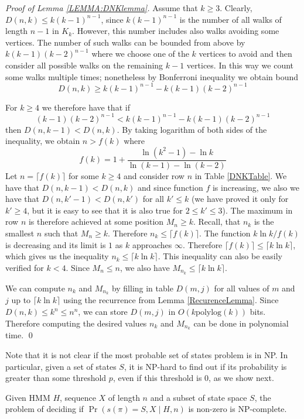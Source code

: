 \begin{proof}[Proof of Lemma \ref{LEMMA:DNKlemma}] 
Assume that $k\ge 3$. Clearly, $D(n,k)\leq k(k-1)^{n-1}$, since
$k(k-1)^{n-1}$ is the number of all walks of length $n-1$ in
$K_k$. However, this number includes also walks avoiding some
vertices. The number of such walks can be bounded from above by
$k(k-1)(k-2)^{n-1}$ where we choose one of the $k$ vertices to avoid
and then consider all possible walks on the remaining $k-1$
vertices. In this way we count some walks multiple times; nonetheless
by Bonferroni inequality we obtain bound $$D(n,k)\geq
k(k-1)^{n-1}-k(k-1)(k-2)^{n-1}$$

For $k\ge 4$ we therefore have that if
$$(k-1)(k-2)^{n-1}<k(k-1)^{n-1}-k(k-1)(k-2)^{n-1}$$ then
$D(n,k-1)<D(n,k)$.  By taking logarithm of both sides of the inequality, we
obtain $n>f(k)$ where $$f(k) = 1+\frac{\ln(k^2-1)-\ln
  k}{\ln(k-1)-\ln(k-2)}$$  Let $n = \lceil f(k)\rceil$ for some $k\ge
4$ and consider row $n$ in Table \ref{DNKTable}.
We have that $D(n,k-1)<D(n,k)$ and since function $f$ is
increasing, we also we have that $D(n,k'-1)<D(n,k')$ for all $k'\le k$ 
(we have proved it only for $k'\ge 4$, but it is easy to see that it is
also true for $2\le k'\le 3$). The maximum in row $n$ is therefore
achieved at some position $M_n \ge k$. Recall, that $n_k$ is the
smallest $n$ such that $M_n\ge k$. Therefore $n_k\leq \lceil f(k)\rceil$.
The function $k \ln k/f(k)$ is decreasing and its limit is $1$ as $k$
approaches $\infty$. Therefore $\lceil f(k)\rceil\leq\lceil k\ln k\rceil$,
which gives us the inequality $n_k\le \lceil k \ln k\rceil$. This inequality 
can also be easily verified for $k<4$. Since $M_n\le n$,
we also have $M_{n_k}\le \lceil k \ln k\rceil$. 

We can compute $n_k$ and $M_{n_k}$ by filling in table $D(m,j)$ for
all values of $m$ and $j$ up to $\lceil k\ln k\rceil$ using the
recurrence from Lemma \ref{RecurenceLemma}. Since $D(n,k)\leq k^n\leq
n^n$, we can store $D(m,j)$ in $O(k \mbox{polylog}(k))$ bits.
Therefore computing the desired values $n_k$ and $M_{n_k}$ 
can be done in polynomial time. \qed
\end{proof}

Note that it is not clear if the most probable set of states problem is in
NP. In particular, given a set of states $S$, it is NP-hard to find out if its
probability is greater than some threshold $p$, even if this threshold
is 0, as we show next.

\begin{theorem}
Given HMM $H$, sequence $X$ of length $n$ 
and a subset of state space $S$, the problem of deciding if
$\Pr\left(s(\pi)=S, X\mid H, n\right)$ is non-zero is NP-complete.
\end{theorem}

